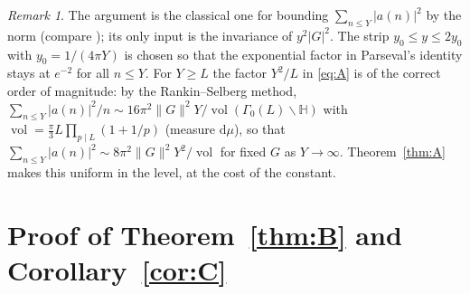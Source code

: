 ﻿\documentclass[11pt]{amsart}
\theoremstyle{remark}
\newtheorem{remark}[theorem]{Remark}
\newcommand{\HH}{\mathbb{H}}
\newcommand{\dd}{\mathrm{d}}
\DeclareMathOperator{\vol}{vol}
\begin{document}
\begin{remark}\label{rem:rankin}
The argument is the classical one for bounding $\sum_{n\le Y}|a(n)|^2$ by the norm (compare \cite[Chapter~5]{IwaTopics}); its only input is the invariance of $y^2|G|^2$. The strip $y_0\le y\le2y_0$ with $y_0=1/(4\pi Y)$ is chosen so that the exponential factor in Parseval's identity stays at $e^{-2}$ for all $n\le Y$. For $Y\ge L$ the factor $Y^2/L$ in \eqref{eq:A} is of the correct order of magnitude: by the Rankin--Selberg method, $\sum_{n\le Y}|a(n)|^2/n\sim 16\pi^2\|G\|^2Y/\vol(\Gamma_0(L)\backslash\HH)$ with $\vol=\frac\pi3L\prod_{p\mid L}(1+1/p)$ (measure $\dd\mu$), so that $\sum_{n\le Y}|a(n)|^2\sim 8\pi^2\|G\|^2Y^2/\vol$ for fixed $G$ as $Y\to\infty$. Theorem~\ref{thm:A} makes this uniform in the level, at the cost of the constant.
\end{remark}

\section{Proof of Theorem~\ref{thm:B} and Corollary~\ref{cor:C}}\label{sec:B}
\end{document}
